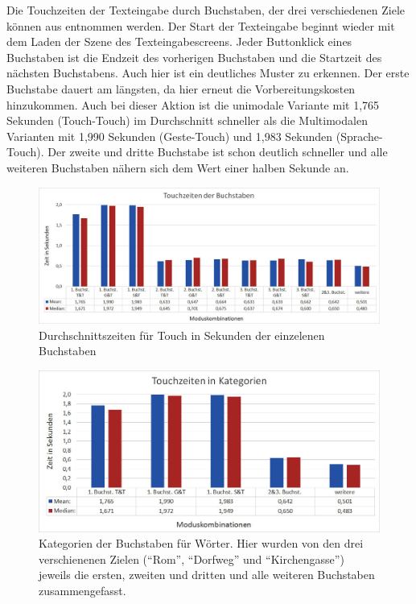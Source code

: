 Die Touchzeiten der Texteingabe durch Buchstaben, der drei verschiedenen Ziele können aus  entnommen werden.
Der Start der Texteingabe beginnt wieder mit dem Laden der Szene des Texteingabescreens.
Jeder Buttonklick eines Buchstaben ist die Endzeit des vorherigen Buchstaben und die Startzeit des nächsten Buchstabens.
Auch hier ist ein deutliches Muster zu erkennen. 
Der erste Buchstabe dauert am längsten, da hier erneut die Vorbereitungskosten hinzukommen. 
Auch bei dieser Aktion ist die unimodale Variante mit 1,765 Sekunden (Touch-Touch) im Durchschnitt schneller als die Multimodalen Varianten mit 1,990 Sekunden (Geste-Touch) und 1,983 Sekunden (Sprache-Touch).
Der zweite und dritte Buchstabe ist schon deutlich schneller und alle weiteren Buchstaben nähern sich dem Wert einer halben Sekunde an. 
\begin{figure}[ht]
  \centering
  \includegraphics[width=1\textwidth]{img/TouchzeitenBuchstabenGesamt.jpg}
  \caption{Durchschnittszeiten für Touch in Sekunden der einzelenen Buchstaben}
  \label{fig:TouchzeitenB_Ges}
\end{figure}
\begin{figure}[ht]
  \centering
  \includegraphics[width=1\textwidth]{img/TouchzeitenKategorien.JPG}
  \caption[Kategorien der Buchstaben für Wörter.]{Kategorien der Buchstaben für Wörter. Hier wurden von den drei verschienenen Zielen ("`Rom"', "`Dorfweg"' und "`Kirchengasse"') jeweils die ersten, zweiten und dritten und alle weiteren Buchstaben zusammengefasst.}
  \label{fig:Kategorien}
\end{figure} 

